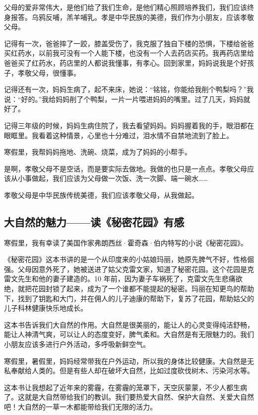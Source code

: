 \documentclass[UTF8,a4paper,titlepage,twoside,10.5pt]{article}
\begin{document}
父母的爱非常伟大，是他们给了我们生命，是他们精心照顾培养我们，我们应该终身报答。乌鸦反哺，羔羊哺乳。孝是中华民族的美德，我们作为小朋友，应该孝敬父母。

记得有一次，爸爸摔了一跤，膝盖受伤了，我克服了独自下楼的恐惧，下楼给爸爸买红药水，以前我可没有一个人能下楼，也没有一个人去药店买药。我再药店里给爸爸买了红药水，药店里的人都说我懂事，有孝心。回到家里，妈妈说我是个好孩子，孝敬父母，很懂事。

记得还有一次，妈妈生病了，起不来床，她说：“铭铭，你能给我削个鸭梨吗？”我说：“好的。”我给妈妈削了个鸭梨，一片一片喂进妈妈的嘴里。过了几天，妈妈就好了。

记得三年级的时候，妈妈生病住院了，我去看望妈妈。妈妈握着我的手，眼泪都在眼眶里。我看着这种情景，心里也十分难过，泪水情不自禁地流到了脸上。

寒假里，我帮妈妈拖地、洗碗、烧菜，成为了妈妈的小帮手。

是啊，孝敬父母不是空话，而是要实际去做地。我做的也只是一点点。孝敬父母应该从小事做起，我们应该为父母做一次饭、洗一次脚、端一碗水……

孝敬父母是中华民族传统美德，我们应该孝敬父母，从我做起。

\subsection{大自然的魅力——读《秘密花园》有感}
\label{sec:org5e3bb68}

寒假里，我有幸读了美国作家弗朗西丝·霍奇森·伯内特写的小说《秘密花园》。

《秘密花园》这本书讲的是一个从印度来的小姑娘玛丽，她原先脾气不好，性格倔强。父母因意外死了，她被送进了姑父克雷文家，知道了秘密花园。这个花园是克雷文先生和他的妻子建造的。10 年前，因为妻子车祸死了，克雷文先生悲痛欲绝，就把花园封锁了起来，成为了一个谁都不能提起的秘密。玛丽在知更鸟的帮助下，找到了钥匙和大门，并在佣人的儿子迪康的帮助下，复苏了花园，帮助姑父的儿子科林健康快乐地成长。

这本书告诉我们大自然的作用。大自然是很美丽的，能让人的心灵变得纯洁舒畅，能让人神清气爽，可以让人的态度变好，脾气柔和。大自然是有无限魅力的。我们小朋友应该多进行户外活动，多呼吸新鲜空气。

寒假里，暑假里，妈妈经常带我在户外运动，所以我的身体比较健康。大自然是无私奉献给人类的。但是有些人却在破坏大自然，比如过度砍伐树木、污染河水等。

这本书让我想起了近年来的雾霾，在雾霾的笼罩下，天空灰蒙蒙，不少人都生病了。这就是大自然带给我们的教训。我们要热爱大自然、保护大自然、关爱大自然吧！大自然的一草一木都能带给我们无限的活力。
\end{document}
